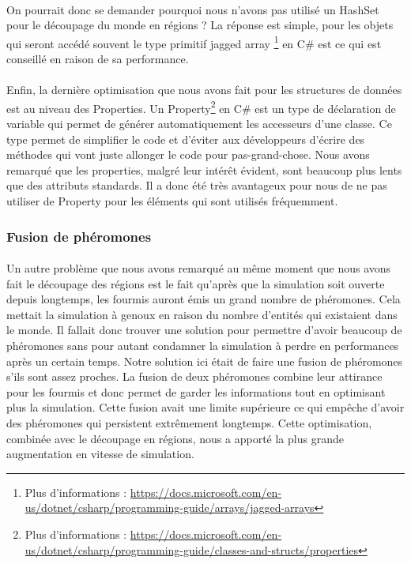 \documentclass{EPUProjetDi}
\begin{document}
\paragraph{}
On pourrait donc se demander pourquoi nous n'avons pas utilisé un HashSet pour le découpage du monde en régions ? 
La réponse est simple, pour les objets qui seront accédé souvent le type primitif jagged array
\footnote{Plus d'informations : \url{https://docs.microsoft.com/en-us/dotnet/csharp/programming-guide/arrays/jagged-arrays}}
en C\# est ce qui est conseillé en raison de sa performance.

\paragraph{}
Enfin, la dernière optimisation que nous avons fait pour les structures de données est au niveau des Properties.
Un Property\footnote{Plus d'informations : \url{https://docs.microsoft.com/en-us/dotnet/csharp/programming-guide/classes-and-structs/properties}}
en C\# est un type de déclaration de variable qui permet de générer automatiquement les accesseurs d'une classe.
Ce type permet de simplifier le code et d'éviter aux développeurs d'écrire des méthodes qui vont juste allonger le code pour pas-grand-chose.
Nous avons remarqué que les properties, malgré leur intérêt évident, sont beaucoup plus lents que des attributs standards. 
Il a donc été très avantageux pour nous de ne pas utiliser de Property pour les éléments qui sont utilisés fréquemment.

\subsubsection{Fusion de phéromones}
\paragraph{}
Un autre problème que nous avons remarqué au même moment que nous avons fait le découpage des régions est le fait qu'après que la simulation soit ouverte depuis longtemps, les fourmis
auront émis un grand nombre de phéromones. Cela mettait la simulation à genoux en raison du nombre d'entités qui existaient dans le monde. Il fallait donc trouver une solution pour permettre
d'avoir beaucoup de phéromones sans pour autant condamner la simulation à perdre en performances après un certain temps.
Notre solution ici était de faire une fusion de phéromones s'ils sont assez proches. La fusion de deux phéromones combine leur attirance pour les fourmis et donc permet de garder les informations
tout en optimisant plus la simulation. Cette fusion avait une limite supérieure ce qui empêche d'avoir des phéromones qui persistent extrêmement longtemps.
Cette optimisation, combinée avec le découpage en régions, nous a apporté la plus grande augmentation en vitesse de simulation.
\end{document}
